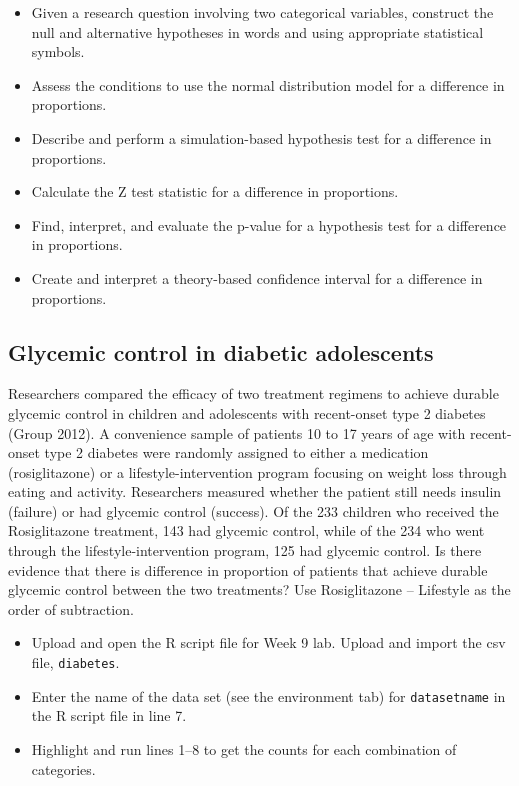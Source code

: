 \documentclass[
]{report}
\begin{document}
\begin{itemize}
\item
  Given a research question involving two categorical variables, construct the null and alternative hypotheses
  in words and using appropriate statistical symbols.
\item
  Assess the conditions to use the normal distribution model for a difference in proportions.
\item
  Describe and perform a simulation-based hypothesis test for a difference in proportions.
\item
  Calculate the Z test statistic for a difference in proportions.
\item
  Find, interpret, and evaluate the p-value for a hypothesis test for a difference in proportions.
\item
  Create and interpret a theory-based confidence interval for a difference in proportions.
\end{itemize}

\hypertarget{glycemic-control-in-diabetic-adolescents}{%
\subsection{Glycemic control in diabetic adolescents}\label{glycemic-control-in-diabetic-adolescents}}

Researchers compared the efficacy of two treatment regimens to achieve durable glycemic control in children and adolescents with recent-onset type 2 diabetes (Group 2012). A convenience sample of patients 10 to 17 years of age with recent-onset type 2 diabetes were randomly assigned to either a medication (rosiglitazone) or a lifestyle-intervention program focusing on weight loss through eating and activity. Researchers measured whether the patient still needs insulin (failure) or had glycemic control (success). Of the 233 children who received the Rosiglitazone treatment, 143 had glycemic control, while of the 234 who went through the lifestyle-intervention program, 125 had glycemic control. Is there evidence that there is difference in proportion of patients that achieve durable glycemic control between the two treatments? Use Rosiglitazone -- Lifestyle as the order of subtraction.

\begin{itemize}
\item
  Upload and open the R script file for Week 9 lab. Upload and import the csv file, \texttt{diabetes}.
\item
  Enter the name of the data set (see the environment tab) for \texttt{datasetname} in the R script file in line 7.
\item
  Highlight and run lines 1--8 to get the counts for each combination of categories.
\end{itemize}
\end{document}
